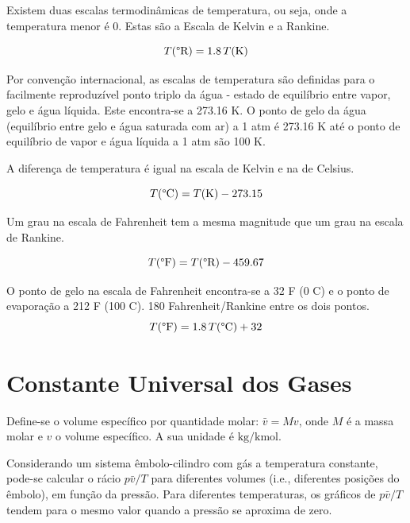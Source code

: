 Existem duas escalas termodinâmicas de temperatura, ou seja, onde a temperatura menor é 0. Estas são a Escala de Kelvin e a Rankine.

\begin{equation}
    T(\text{\textdegree R}) = 1.8 \, T(\text{K})
\end{equation}

Por convenção internacional, as escalas de temperatura são definidas para o facilmente reproduzível ponto triplo da água - estado de equilíbrio entre vapor, gelo e água líquida. Este encontra-se a 273.16 K. O ponto de gelo da água (equilíbrio entre gelo e água saturada com ar) a 1 atm é 273.16 K até o ponto de equilíbrio de vapor e água líquida a 1 atm são 100 K.

A diferença de temperatura é igual na escala de Kelvin e na de Celsius. 

\begin{equation}
    T(\text{\textdegree C}) = T(\text{K}) - 273.15
\end{equation}

Um grau na escala de Fahrenheit tem a mesma magnitude que um grau na escala de Rankine.

\begin{equation}
    T(\text{\textdegree F}) = T(\text{\textdegree R}) - 459.67
\end{equation}

O ponto de gelo na escala de Fahrenheit encontra-se a 32 \textdegree F (0 \textdegree C) e o ponto de evaporação a 212 \textdegree F (100 \textdegree C). 180 Fahrenheit/Rankine entre os dois pontos. 
\begin{equation}
    T(\text{\textdegree F}) = 1.8 \, T(\text{\textdegree C}) + 32
\end{equation}


\section{Constante Universal dos Gases}

Define-se o volume específico por quantidade molar: $\bar{v} = M v$, onde $M$ é a massa molar e $v$ o volume específico. A sua unidade é $\text{kg}/\text{kmol}$.

Considerando um sistema êmbolo-cilindro com gás a temperatura constante, pode-se calcular o rácio $p \bar{v} / T$ para diferentes volumes (i.e., diferentes posições do êmbolo), em função da pressão. Para diferentes temperaturas, os gráficos de $p \bar{v} / T$ tendem para o mesmo valor quando a pressão se aproxima de zero.

